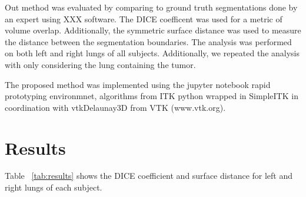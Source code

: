 \documentclass{llncs}
\begin{document}
Out method was evaluated by comparing to ground truth segmentations done by an expert using XXX software. The DICE coefficent was used for a metric of volume overlap. Additionally, the symmetric surface distance was used to measure the distance between the segmentation boundaries. The analysis was performed on both left and right lungs of all subjects. Additionally, we repeated the analysis with only considering the lung containing the tumor.


The proposed method was implemented using the jupyter notebook \cite{PER-GRA:2007} rapid prototyping environmnet,  algorithms from ITK\cite{johnson2015itk} python wrapped in SimpleITK \cite{10.3389/fninf.2013.00045} in coordination with vtkDelaunay3D from VTK (www.vtk.org).


%
\section{Results}
%
Table ~\ref{tab:results} shows the DICE coefficient and surface distance for left and right lungs of each subject. 

\newlength\intercol
\setlength\intercol{15pt}
\newlength\betweenwidth
\setlength\betweenwidth{10pt}
\newcommand\icspace{@{\hspace\intercol}}
\newcommand\inspace{@{\hspace\betweenwidth}}
\newcommand\MC[1]{\multicolumn{2}{c\icspace}{#1}}
\newcommand\MClast[1]{\multicolumn{2}{c}{#1}}
\end{document}
